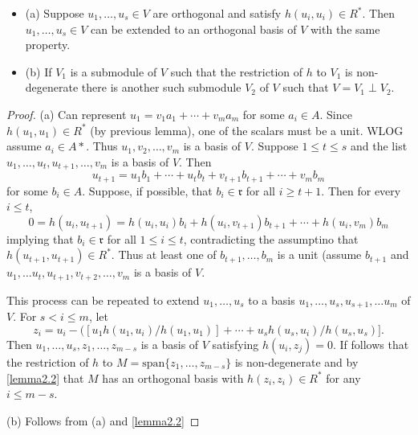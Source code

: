 \documentclass[11pt]{article}
\begin{document}
\begin{lemma}
\begin{itemize}
\item{(a)} Suppose $u_1, \dotsc, u_s \in V$ are orthogonal and satisfy $h(u_i, u_i) \in R^*$.
Then $u_1, \dotsc , u_s \in V$ can be extended to an orthogonal basis of $V$ with the same property.
\item{(b)} If $V_1$ is a submodule of $V$ such that the restriction of $h$ to $V_1$ is non-degenerate there is another such submodule $V_2$ of $V$ such that $V = V_1 \perp V_2$.
\end{itemize}
\end{lemma}
\begin{proof}
(a) Can represent $u_1 = v_1 a_1 + \dotsb + v_m a_m$ for some $a_i \in A$.
Since $h(u_1, u_1) \in R^*$ (by previous lemma), one of the scalars must be a unit. WLOG assume $a_i \in A*$.
Thus $u_1, v_2, \dotsc, v_m$ is a basis of $V$.
Suppose $1 \le t \le s$ and the list $u_1, \dotsc, u_t, u_{t+1}, \dotsc, v_m$ is a basis of $V$.
Then 
\[
u_{t+1} = u_1b_1 + \dotsb + u_t b_t + v_{t+1} b_{t+1} + \dotsb + v_m b_m
\]
for some $b_i \in A$.
Suppose, if possible, that $b_i \in \mathfrak{r}$ for all $i \ge t+1$.
Then for every $i \le t$,
\[
0 = h(u_i, u_{t+1}) = h(u_i, u_i) b_i + h(u_i, v_{t+1})b_{t+1} + \dotsb + h(u_i, v_m) b_m
\]
implying that $b_i \in \mathfrak{r}$ for all $1 \le i \le t$, contradicting the assumptino that $h(u_{t+1}, u_{t+1}) \in R^*$.
Thus at least one of $b_{t+1}, \dotsc,b_m$ is a unit (assume $b_{t+1}$ and $u_1, \dotsc u_t, u_{t+1}, v_{t+2}, \dotsc, v_m$ is a basis of $V$.

This process can be repeated to extend $u_1, \dotsc, u_s$ to a basis $u_1, \dotsc, u_s, u_{s+1}, \dotsc u_m$ of $V$.
For $s < i \le m$, let
\[
z_i = u_i - ([u_1h(u_1, u_i)/h(u_1, u_1)] + \dotsb + u_s h(u_s, u_i) / h(u_s, u_s)].
\]
Then $u_1, \dotsc, u_s, z_1, \dotsc, z_{m-s}$ is a basis of $V$ satisfying $h(u_i, z_j) = 0$.
If follows that the restriction of $h$ to $M = \text{span} \{z_1, \dotsc, z_{m-s}\}$ is non-degenerate and by \cref{lemma2.2} that $M$ has an orthogonal basis with $h(z_i, z_i) \in R^*$ for any $i \le m - s$.

(b) Follows from (a) and \cref{lemma2.2}
\end{proof}
\end{document}
